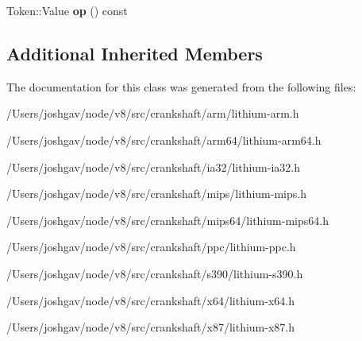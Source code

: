 \begin{DoxyCompactItemize}
\item 
Token\+::\+Value {\bfseries op} () const \hypertarget{classv8_1_1internal_1_1_l_string_compare_and_branch_a1cb19d2583db6113ac7e91498f484880}{}\label{classv8_1_1internal_1_1_l_string_compare_and_branch_a1cb19d2583db6113ac7e91498f484880}

\end{DoxyCompactItemize}
\subsection*{Additional Inherited Members}


The documentation for this class was generated from the following files\+:\begin{DoxyCompactItemize}
\item 
/\+Users/joshgav/node/v8/src/crankshaft/arm/lithium-\/arm.\+h\item 
/\+Users/joshgav/node/v8/src/crankshaft/arm64/lithium-\/arm64.\+h\item 
/\+Users/joshgav/node/v8/src/crankshaft/ia32/lithium-\/ia32.\+h\item 
/\+Users/joshgav/node/v8/src/crankshaft/mips/lithium-\/mips.\+h\item 
/\+Users/joshgav/node/v8/src/crankshaft/mips64/lithium-\/mips64.\+h\item 
/\+Users/joshgav/node/v8/src/crankshaft/ppc/lithium-\/ppc.\+h\item 
/\+Users/joshgav/node/v8/src/crankshaft/s390/lithium-\/s390.\+h\item 
/\+Users/joshgav/node/v8/src/crankshaft/x64/lithium-\/x64.\+h\item 
/\+Users/joshgav/node/v8/src/crankshaft/x87/lithium-\/x87.\+h\end{DoxyCompactItemize}

